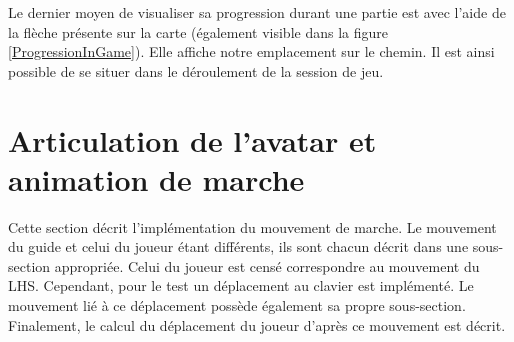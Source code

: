 		\begin{minipage}{\linewidth}
			\label{ProgressionInGame}
		\end{minipage}\medskip%
		
		Le dernier moyen de visualiser sa progression durant une partie est avec l'aide de la flèche présente sur la carte (également visible dans la figure \ref{ProgressionInGame}). Elle affiche notre emplacement sur le chemin. Il est ainsi possible de se situer dans le déroulement de la session de jeu.
		

\section{Articulation de l'avatar et animation de marche}
	\label{sDevArticulation}
	Cette section décrit l'implémentation du mouvement de marche. Le mouvement du guide et celui du joueur étant différents, ils sont chacun décrit dans une sous-section appropriée. Celui du joueur est censé correspondre au mouvement du LHS. Cependant, pour le test un déplacement au clavier est implémenté. Le mouvement lié à ce déplacement possède également sa propre sous-section. Finalement, le calcul du déplacement du joueur d'après ce mouvement est décrit.
